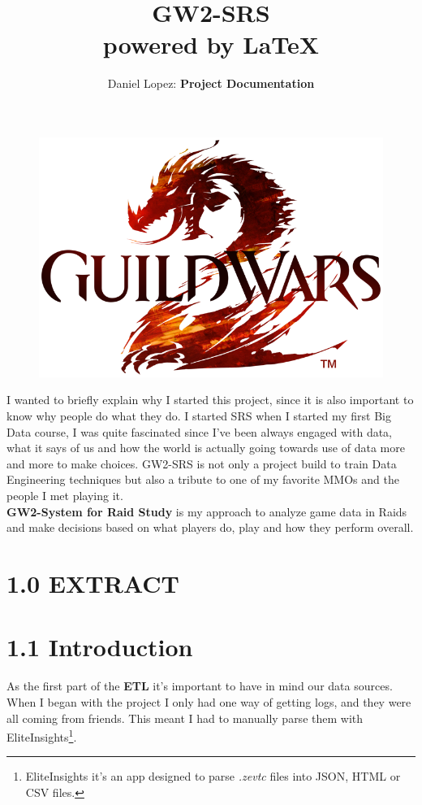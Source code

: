 \documentclass[12pt,a4paper]{article}
\title{%
    \vspace*{-5mm}\Huge \textbf{GW2-SRS} \\
    \vspace*{2mm}\Large powered by \LaTeX}
\author{\vspace*{-5mm}\large Daniel Lopez: \textbf{Project Documentation}}
\begin{document}
    \maketitle

    \begin{figure}[H]
        \centering
        \includegraphics[width=1 \textwidth]{Images/Nuevo_logo_GW2.png}
    \end{figure}

    \newpage

    \begin{tcolorbox}
        I wanted to briefly explain why I started this project, since it is also important to
        know why people do what they do. I started SRS when I started my first Big Data course, I
        was quite fascinated since I've been always engaged with data, what it says of us and how
        the world is actually going towards use of data more and more to make choices. GW2-SRS is
        not only a project build to train Data Engineering techniques but also a tribute to one of 
        my favorite MMOs and the people I met playing it.\\

        \textbf{GW2-System for Raid Study} is my approach to analyze game data in Raids and make
        decisions based on what players do, play and how they perform overall.
    \end{tcolorbox}

    \section*{1.0 EXTRACT}

    \section*{\large 1.1 Introduction}
    As the first part of the \textbf{ETL} it's important to have in mind our data sources. When
    I began with the project I only had one way of getting logs, and they were all coming
    from friends. This meant I had to manually parse them with EliteInsights\footnote{EliteInsights it's an app designed to parse \textit{.zevtc} files into JSON, HTML or CSV files.}. 
\end{document}
